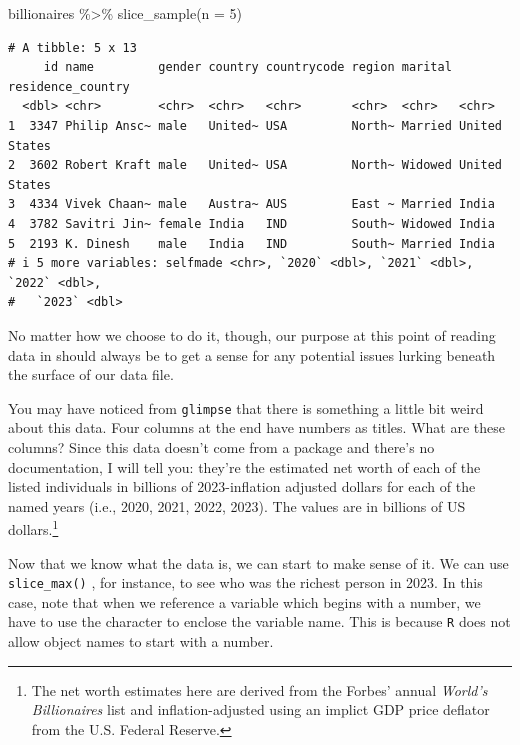\documentclass[
  letterpaper,
]{book}
\newenvironment{Shaded}{\begin{snugshade}}{\end{snugshade}}
\newcommand{\AttributeTok}[1]{\textcolor[rgb]{0.40,0.45,0.13}{#1}}
\newcommand{\DecValTok}[1]{\textcolor[rgb]{0.68,0.00,0.00}{#1}}
\newcommand{\FunctionTok}[1]{\textcolor[rgb]{0.28,0.35,0.67}{#1}}
\newcommand{\NormalTok}[1]{\textcolor[rgb]{0.00,0.23,0.31}{#1}}
\newcommand{\SpecialCharTok}[1]{\textcolor[rgb]{0.37,0.37,0.37}{#1}}
\begin{document}
\begin{Shaded}
\begin{Highlighting}[]
\NormalTok{billionaires }\SpecialCharTok{\%\textgreater{}\%}
  \FunctionTok{slice\_sample}\NormalTok{(}\AttributeTok{n =} \DecValTok{5}\NormalTok{)}
\end{Highlighting}
\end{Shaded}

\begin{verbatim}
# A tibble: 5 x 13
     id name         gender country countrycode region marital residence_country
  <dbl> <chr>        <chr>  <chr>   <chr>       <chr>  <chr>   <chr>            
1  3347 Philip Ansc~ male   United~ USA         North~ Married United States    
2  3602 Robert Kraft male   United~ USA         North~ Widowed United States    
3  4334 Vivek Chaan~ male   Austra~ AUS         East ~ Married India            
4  3782 Savitri Jin~ female India   IND         South~ Widowed India            
5  2193 K. Dinesh    male   India   IND         South~ Married India            
# i 5 more variables: selfmade <chr>, `2020` <dbl>, `2021` <dbl>, `2022` <dbl>,
#   `2023` <dbl>
\end{verbatim}

No matter how we choose to do it, though, our purpose at this point of
reading data in should always be to get a sense for any potential issues
lurking beneath the surface of our data file.

You may have noticed from \texttt{glimpse} that there is something a
little bit weird about this data. Four columns at the end have numbers
as titles. What are these columns? Since this data doesn't come from a
package and there's no documentation, I will tell you: they're the
estimated net worth of each of the listed individuals in billions of
2023-inflation adjusted dollars for each of the named years (i.e., 2020,
2021, 2022, 2023). The values are in billions of US dollars.\footnote{The
  net worth estimates here are derived from the Forbes' annual
  \emph{World's Billionaires} list and inflation-adjusted using an
  implict GDP price deflator from the U.S. Federal Reserve.}

Now that we know what the data is, we can start to make sense of it. We
can use \texttt{slice\_max()} , for instance, to see who was the richest
person in 2023. In this case, note that when we reference a variable
which begins with a number, we have to use the
\texttt{\textasciigrave{}} character to enclose the variable name. This
is because \texttt{R} does not allow object names to start with a
number.
\end{document}

